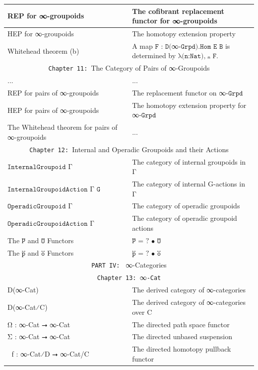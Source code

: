 \documentclass{book}
\theoremstyle{definition}
\begin{document}
{\begin{longtable}{|| l || l ||}
REP for ∞-groupoids & The cofibrant replacement functor for ∞-groupoids\\
\hline
HEP for ∞-groupoids & The homotopy extension property\\
\hline
Whitehead theorem (b) & A map $\texttt{F : D(}$∞$\texttt{-Grpd).Hom E B}$ is determined by $\texttt{λ(n:Nat),}$π⃡ₙ
$\texttt{F}$. \\
\hline \hline
\multicolumn{2}{||c||}{\texttt{Chapter 11: }The Category of Pairs of ∞-Groupoids} \\
\hline \hline
... & ...\\
\hline
REP for pairs of ∞-groupoids & The replacement functor on ∞$\texttt{-Grpd}$ \\
\hline
HEP for pairs of ∞-groupoids & The homotopy extension property for ∞$\texttt{-Grpd}$\\
 \hline 
The Whitehead theorem for pairs of ∞-groupoids & ... \\
\hline \hline
\multicolumn{2}{||c||}{\texttt{Chapter 12: }Internal and Operadic Groupoids and their Actions} \\
\hline \hline
 $\texttt{InternalGroupoid Γ}$   & The category of internal groupoids in Γ \\
 \hline
 $\texttt{InternalGroupoidAction Γ G}$ & The category of internal G-actions in Γ \\
 \hline
  $\texttt{OperadicGroupoid Γ}$  & The category of operadic groupoids  \\
 \hline
 $\texttt{OperadicGroupoidAction Γ}$  & The category of operadic groupoid actions  \\
  \hline
  The $\texttt{P⃡}$ and $\texttt{O⃡}$ Functors & $\texttt{P⃡ = ? • O⃡}$ \\
 \hline
 The $\texttt{p⃡}$ and $\texttt{o⃡}$ Functors & $\texttt{p⃡ = ? • o⃡}$ \\
 \hline \hline
 \multicolumn{2}{||c||}{\texttt{PART IV: } ∞-Categories} \\
\hline \hline
\multicolumn{2}{||c||}{\texttt{Chapter 13: }∞\texttt{-Cat}} \\
\hline \hline
D(∞-Cat) & The derived category of ∞-categories \\
\hline
D(∞-Cat⁄C) & The derived category of ∞-categories over C \\
\hline
Ω⃗ : ∞-Cat ⭢ ∞-Cat & The directed path space functor \\
 \hline 
 Σ⃗ : ∞-Cat ⭢ ∞-Cat & The directed unbased suspension \\
\hline 
ω⃗ f : ∞-Cat⁄D ⭢ ∞-Cat/C & The directed homotopy pullback functor\\

\end{longtable}}
\end{document}
